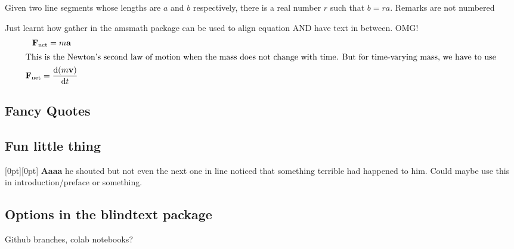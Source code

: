 \begin{remark}
Given two line segments whose lengths are $a$ and $b$ respectively, there is a 
real number $r$ such that $b=ra$.
Remarks are not numbered
\end{remark}


Just learnt how gather in the amsmath  package can be used to align equation AND have text in between. OMG!
\begin{gather}
\vec{F}_\text{net} = m \vec{a}\\
\intertext{This is the Newton's second law of motion when the mass does not change with time. But for time-varying mass, we have to use}
\vec{F}_\text{net} = \frac{\textrm{d}(m\vec{v})}{\textrm{d}t}
\end{gather}

\subsection{Fancy Quotes}



\subsection{Fun little thing}
\raisebox{0pt}[0pt][0pt]{\Large%
  \textbf{Aaaa\raisebox{-0.3ex}{a}%
    \raisebox{-0.7ex}{aa}%
    \raisebox{-1.2ex}{r}%
    \raisebox{-2.2ex}{g}%
    \raisebox{-4.5ex}{h}
  }
}
he shouted but not even the next
one in line noticed that something
terrible had happened to him. Could maybe use this in introduction/preface or something.

\subsection{Options in the blindtext package}
\blindenumerate
\blinddescription
\blindmathpaper


Github branches, colab notebooks?





